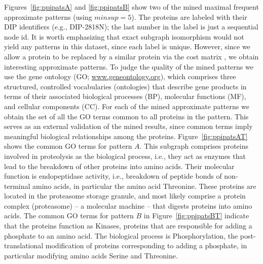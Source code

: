 \smallskip{}
Figures~\ref{fig:ppipatsA} and \ref{fig:ppipatsB} show two of the mined
maximal frequent approximate patterns (using $minsup=5$). The proteins
are labeled with their DIP identifiers (e.g., DIP-2818N); the last
number in the label is just a sequential node id.  It is worth
emphasizing that exact subgraph isomorphism would not yield any patterns
in this dataset, since each label is unique. However, since we allow a
protein to be replaced by a similar protein via the cost matrix \Cs,
we obtain interesting approximate patterns. To judge the quality of the
mined patterns we use the gene ontology (GO;
\url{www.geneontology.org}), which comprises three structured,
controlled vocabularies (ontologies) that describe gene products in
terms of their associated biological processes (BP), molecular functions
(MF), and cellular components (CC).  For each of the mined approximate
patterns we obtain the set of all the GO terms common to all proteins in
the pattern. This serves as an external validation of the mined results,
since common terms imply meaningful biological relationships among the
proteins.  Figure~\ref{fig:ppipatsAT} shows the common GO terms for
pattern $A$.  This subgraph comprises proteins involved in proteolysis
as the biological process, i.e., they act as enzymes that lead to the
breakdown of other proteins into amino acids. Their molecular function
is endopeptidase activity, i.e., breakdown of peptide bonds of
non-terminal amino acids, in particular the amino acid Threonine.  These
proteins are located in the proteasome storage granule, and most likely
comprise a protein complex (proteasome) -- a molecular machine --
that digests proteins into amino acids.  The common GO terms for pattern
$B$ in Figure~\ref{fig:ppipatsBT} indicate that the proteins function as
Kinases, proteins that are responsible for adding a phosphate to an
amino acid. The biological process is Phosphorylation, the
post-translational modification of proteins corresponding to adding a
phosphate, in particular modifying amino acids Serine and Threonine. 

